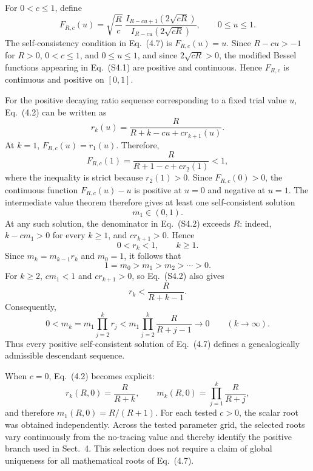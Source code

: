\documentclass[9pt,a4paper]{article}
\begin{document}
For $0<c\leq1$, define
\begin{equation}
F_{R,c}(u)=\sqrt{\frac{R}{c}}\;\frac{I_{R-cu+1}\!\left(2\sqrt{cR}\right)}{I_{R-cu}\!\left(2\sqrt{cR}\right)},
\qquad 0\leq u\leq1.
\tag{S4.1}
\end{equation}
The self-consistency condition in Eq.~(4.7) is $F_{R,c}(u)=u$. Since $R-cu>-1$ for $R>0$, $0<c\leq1$, and $0\leq u\leq1$, and since $2\sqrt{cR}>0$, the modified Bessel functions appearing in Eq.~(S4.1) are positive and continuous. Hence $F_{R,c}$ is continuous and positive on $[0,1]$.

For the positive decaying ratio sequence corresponding to a fixed trial value $u$, Eq.~(4.2) can be written as
\begin{equation}
r_k(u)=\frac{R}{R+k-cu+cr_{k+1}(u)}.
\tag{S4.2}
\end{equation}
At $k=1$, $F_{R,c}(u)=r_1(u)$. Therefore,
\begin{equation}
F_{R,c}(1)=\frac{R}{R+1-c+cr_2(1)}<1,
\tag{S4.3}
\end{equation}
where the inequality is strict because $r_2(1)>0$. Since $F_{R,c}(0)>0$, the continuous function $F_{R,c}(u)-u$ is positive at $u=0$ and negative at $u=1$. The intermediate value theorem therefore gives at least one self-consistent solution
\begin{equation}
m_1\in(0,1).
\tag{S4.4}
\end{equation}
At any such solution, the denominator in Eq.~(S4.2) exceeds $R$: indeed, $k-cm_1>0$ for every $k\geq1$, and $cr_{k+1}>0$. Hence
\begin{equation}
0<r_k<1,\qquad k\geq1.
\tag{S4.5}
\end{equation}
Since $m_k=m_{k-1}r_k$ and $m_0=1$, it follows that
\begin{equation}
1=m_0>m_1>m_2>\cdots>0.
\tag{S4.6}
\end{equation}
For $k\geq2$, $cm_1<1$ and $cr_{k+1}>0$, so Eq.~(S4.2) also gives
\begin{equation}
r_k<\frac{R}{R+k-1}.
\tag{S4.7}
\end{equation}
Consequently,
\begin{equation}
0<m_k=m_1\prod_{j=2}^{k}r_j<m_1\prod_{j=2}^{k}\frac{R}{R+j-1}\longrightarrow0\qquad(k\to\infty).
\tag{S4.8}
\end{equation}
Thus every positive self-consistent solution of Eq.~(4.7) defines a genealogically admissible descendant sequence.

When $c=0$, Eq.~(4.2) becomes explicit:
\begin{equation}
r_k(R,0)=\frac{R}{R+k},
\qquad
m_k(R,0)=\prod_{j=1}^{k}\frac{R}{R+j},
\tag{S4.9}
\end{equation}
and therefore $m_1(R,0)=R/(R+1)$. For each tested $c>0$, the scalar root was obtained independently. Across the tested parameter grid, the selected roots vary continuously from the no-tracing value and thereby identify the positive branch used in Sect.~4. This selection does not require a claim of global uniqueness for all mathematical roots of Eq.~(4.7).
\end{document}
